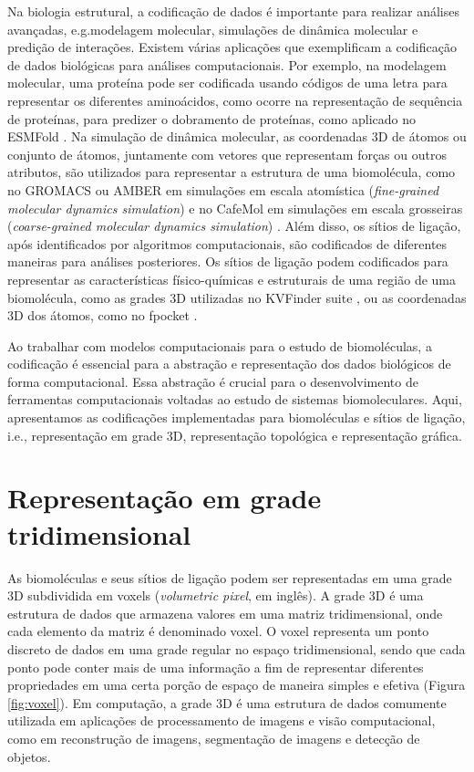 \documentclass[Portugues]{phdquali}
\def\ie{i.e.\onedot}
\def\eg{e.g.\onedot}
\begin{document}
Na biologia estrutural, a codificação de dados é importante para realizar análises avançadas, \eg modelagem molecular, simulações de dinâmica molecular e predição de interações. Existem várias aplicações que exemplificam a codificação de dados biológicas para análises computacionais. Por exemplo, na modelagem molecular, uma proteína pode ser codificada usando códigos de uma letra para representar os diferentes aminoácidos, como ocorre na representação de sequência de proteínas, para predizer o dobramento de proteínas, como aplicado no ESMFold \cite{lin2022}. Na simulação de dinâmica molecular, as coordenadas 3D de átomos ou conjunto de átomos, juntamente com vetores que representam forças ou outros atributos, são utilizados para representar a estrutura de uma biomolécula, como no GROMACS \cite{gromacs} ou AMBER \cite{amber} em simulações em escala atomística (\textit{fine-grained molecular dynamics simulation}) e no CafeMol em simulações em escala grosseiras (\textit{coarse-grained molecular dynamics simulation}) \cite{kenzaki2011}. Além disso, os sítios de ligação, após identificados por algoritmos computacionais, são codificados de diferentes maneiras para análises posteriores. Os sítios de ligação podem codificados para representar as características físico-químicas e estruturais de uma região de uma biomolécula, como as grades 3D utilizadas no KVFinder suite \cite{oliveira2014,guerra2020,guerra2021,guerra2023B}, ou as coordenadas 3D dos átomos, como no fpocket \cite{fpocket}.

Ao trabalhar com modelos computacionais para o estudo de biomoléculas, a codificação é essencial para a abstração e representação dos dados biológicos de forma computacional. Essa abstração é crucial para o desenvolvimento de ferramentas computacionais voltadas ao estudo de sistemas biomoleculares. Aqui, apresentamos as codificações implementadas para biomoléculas e sítios de ligação, \ie, representação em grade 3D, representação topológica e representação gráfica.

\section{Representação em grade tridimensional}

As biomoléculas e seus sítios de ligação podem ser representadas em uma grade 3D subdividida em voxels (\textit{volumetric pixel}, em inglês). A grade 3D é uma estrutura de dados que armazena valores em uma matriz tridimensional, onde cada elemento da matriz é denominado voxel. O voxel representa um ponto discreto de dados em uma grade regular no espaço tridimensional, sendo que cada ponto pode conter mais de uma informação a fim de representar diferentes propriedades em uma certa porção de espaço de maneira simples e efetiva (Figura \ref{fig:voxel}). Em computação, a grade 3D é uma estrutura de dados comumente utilizada em aplicações de processamento de imagens e visão computacional, como em reconstrução de imagens, segmentação de imagens e detecção de objetos. 
\end{document}
